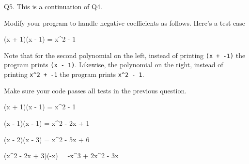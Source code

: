 Q5. This is a continuation of Q4.

Modify your program to handle negative coefficients as follows. 
Here's a test case
\begin{console}[commandchars=\\\{\}]
(x + 1)(x - 1) = x^2 - 1
\end{console}
Note that for the second polynomial on the left, instead of printing
\verb!(x + -1)!
the program prints
\verb!(x - 1)!.
Likewise, the polynomial on the right, instead of printing
\verb!x^2 + -1!
the program prints
\verb!x^2 - 1!.

Make sure your code passes all tests in the previous question.

\resett
\nextt
\begin{console}[commandchars=\\\{\}]
(x + 1)(x - 1) = x^2 - 1
\end{console}

\nextt
\begin{console}[commandchars=\\\{\}]
(x - 1)(x - 1) = x^2 - 2x + 1
\end{console}

\nextt
\begin{console}[commandchars=\\\{\}]
(x - 2)(x - 3) = x^2 - 5x + 6
\end{console}

\nextt
\begin{console}[commandchars=\\\{\}]
(x^2 - 2x + 3)(-x) = -x^3 + 2x^2 - 3x
\end{console}
